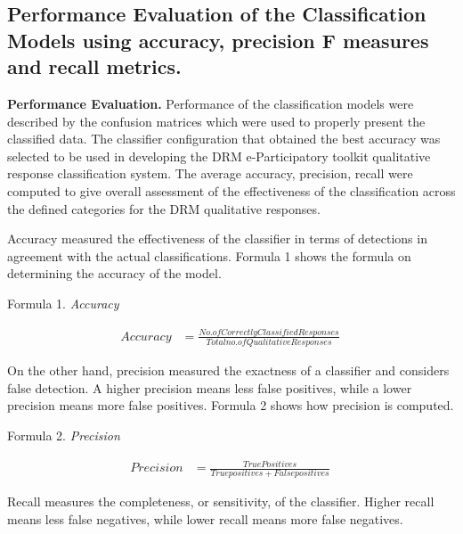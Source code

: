 \subsection{Performance Evaluation of the Classification Models using accuracy, precision F measures and recall metrics. }

\textbf{Performance Evaluation.} Performance of the classification models were described by the confusion matrices which were used to properly present the classified data. The classifier configuration that obtained the best accuracy was selected to be used in developing the DRM e-Participatory toolkit qualitative response classification system. The average accuracy, precision, recall were computed to give overall assessment of the effectiveness of the classification across the defined categories for the DRM qualitative responses.

Accuracy measured the effectiveness of the classifier in terms of detections in agreement with the actual classifications.  Formula 1 shows the formula on determining the accuracy of the model.

\begin{center}
Formula 1. \textit{ Accuracy}
\end{center}
\vspace{-2ex}
\begin{equation}
\begin{align*}
Accuracy &= \frac{No. of Correctly Classified Responses}{Total no.of Qualitative Responses}\
\end{align*}
\end{equation}

On the other hand, precision measured the exactness of a classifier and considers false detection. A higher precision means less false positives, while a lower precision means more false positives. Formula 2 shows how precision is computed.

\begin{center}
Formula 2. \textit{Precision}
\end{center}
\begin{equation}
\begin{align*}
Precision &= \frac{True Positives}{True positives + False positives}\
\end{align*}
\end{equation}


Recall measures the completeness, or sensitivity, of the classifier. Higher recall means less false negatives, while lower recall means more false negatives.

